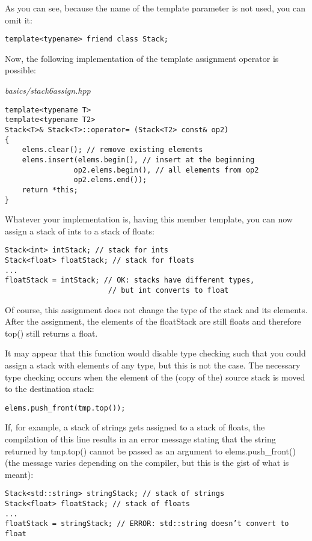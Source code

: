 As you can see, because the name of the template parameter is not used, you can omit it:

\begin{lstlisting}[style=styleCXX]
template<typename> friend class Stack;
\end{lstlisting}

Now, the following implementation of the template assignment operator is possible:

\noindent
\textit{basics/stack6assign.hpp}
\begin{lstlisting}[style=styleCXX]
template<typename T>
template<typename T2>
Stack<T>& Stack<T>::operator= (Stack<T2> const& op2)
{
	elems.clear(); // remove existing elements
	elems.insert(elems.begin(), // insert at the beginning
				op2.elems.begin(), // all elements from op2
				op2.elems.end());
	return *this;
}
\end{lstlisting}

Whatever your implementation is, having this member template, you can now assign a stack of ints to a stack of floats:

\begin{lstlisting}[style=styleCXX]
Stack<int> intStack; // stack for ints
Stack<float> floatStack; // stack for floats
...
floatStack = intStack; // OK: stacks have different types,
						// but int converts to float
\end{lstlisting}

Of course, this assignment does not change the type of the stack and its elements. After the assignment, the elements of the floatStack are still floats and therefore top() still returns a float.

It may appear that this function would disable type checking such that you could assign a stack with elements of any type, but this is not the case. The necessary type checking occurs when the element of the (copy of the) source stack is moved to the destination stack:

\begin{lstlisting}[style=styleCXX]
elems.push_front(tmp.top());
\end{lstlisting}

If, for example, a stack of strings gets assigned to a stack of floats, the compilation of this line results in an error message stating that the string returned by tmp.top() cannot be passed as an argument to elems.push\_front() (the message varies depending on the compiler, but this is the gist of what is meant):

\begin{lstlisting}[style=styleCXX]
Stack<std::string> stringStack; // stack of strings
Stack<float> floatStack; // stack of floats
...
floatStack = stringStack; // ERROR: std::string doesn’t convert to float
\end{lstlisting}

